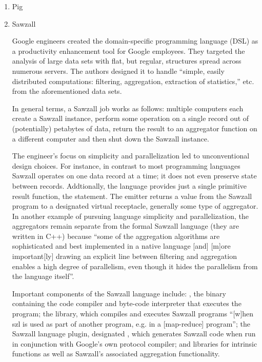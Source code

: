 \begin{enumerate}
\item {} 
Pig

\item {} 
Sawzall

Google engineers created the domain-specific programming language
(DSL)  as a productivity enhancement tool for Google
employees.  They targeted the analysis of large data sets with
flat, but regular, structures spread across numerous servers.
The authors designed it to handle ``simple, easily distributed
computations: filtering, aggregation, extraction of statistics,''
etc. from the aforementioned data sets.
\label{\detokenize{i524/technologies:id245}}{\hyperref[\detokenize{i524/technologies:pike05sawzall}]{\sphinxcrossref{{[}206{]}}}}

In general terms, a Sawzall job works as follows: multiple
computers each create a Sawzall instance, perform some operation
on a single record out of (potentially) petabytes of data, return
the result to an aggregator function on a different computer and
then shut down the Sawzall instance.

The engineer's focus on simplicity and parallelization led to
unconventional design choices.  For instance, in contrast to most
programming languages Sawzall operates on one data record at a
time; it does not even preserve state between records.
\label{\detokenize{i524/technologies:id246}}{\hyperref[\detokenize{i524/technologies:www-bytemining-sawzall}]{\sphinxcrossref{{[}207{]}}}} Addtionally, the language provides
just a single primitive result function, the  statement.
The emitter returns a value from the Sawzall program to a
designated virtual receptacle, generally some type of aggregator.
In another example of pursuing language simplicity and
parallelization, the aggregators remain separate from the formal
Sawzall language (they are written in C++) because ``some of the
aggregation algorithms are sophisticated and best implemented in
a native language {[}and{]} {[}m{]}ore important{[}ly{]} drawing an explicit
line between filtering and aggregation enables a high degree of
parallelism, even though it hides the parallelism from the
language itself''.  \label{\detokenize{i524/technologies:id247}}{\hyperref[\detokenize{i524/technologies:pike05sawzall}]{\sphinxcrossref{{[}206{]}}}}

Important components of the Sawzall language include: , the
binary containing the code compiler and byte-code interpreter
that executes the program; the  library, which compiles
and executes Sawzall programs ``{[}w{]}hen szl is used as part of
another program, e.g. in a {[}map-reduce{]} program''; the Sawzall
language plugin, designated , which generates
Sawzall code when run in conjunction with Google's own 
protocol compiler; and libraries for intrinsic functions as well
as Sawzall's associated aggregation functionality.
\label{\detokenize{i524/technologies:id248}}{\hyperref[\detokenize{i524/technologies:www-google-code-wiki-sawzall}]{\sphinxcrossref{{[}208{]}}}}


\end{enumerate}
